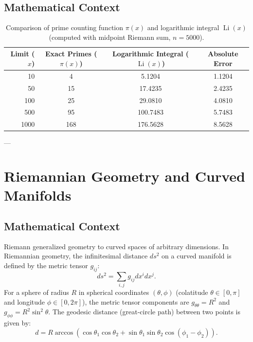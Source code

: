 \documentclass[11pt]{amsart}
\theoremstyle{definition}
\begin{document}
\subsection{Mathematical Context}

\begin{table}[h!]
\centering
\small
\begin{tabular}{rccc}
\toprule
\textbf{Limit ($x$)} & \textbf{Exact Primes ($\pi(x)$)} & \textbf{Logarithmic Integral ($\operatorname{Li}(x)$)} & \textbf{Absolute Error} \\
\midrule
10 & 4 & 5.1204 & 1.1204 \\
50 & 15 & 17.4235 & 2.4235 \\
100 & 25 & 29.0810 & 4.0810 \\
500 & 95 & 100.7483 & 5.7483 \\
1000 & 168 & 176.5628 & 8.5628 \\
\bottomrule
\end{tabular}
\caption{Comparison of prime counting function $\pi(x)$ and logarithmic integral $\operatorname{Li}(x)$ (computed with midpoint Riemann sum, $n=5000$).}
\label{tab:primes}
\end{table}

---

\section{Riemannian Geometry and Curved Manifolds}
\label{sec:geometry}

\subsection{Mathematical Context}
Riemann generalized geometry to curved spaces of arbitrary dimensions. In Riemannian geometry, the infinitesimal distance $ds^2$ on a curved manifold is defined by the metric tensor $g_{ij}$:
\begin{equation}
\label{eq:metric}
ds^2 = \sum_{i,j} g_{ij} dx^i dx^j.
\end{equation}
For a sphere of radius $R$ in spherical coordinates $(\theta, \phi)$ (colatitude $\theta \in [0, \pi]$ and longitude $\phi \in [0, 2\pi]$), the metric tensor components are $g_{\theta\theta} = R^2$ and $g_{\phi\phi} = R^2\sin^2\theta$. The geodesic distance (great-circle path) between two points is given by:
\begin{equation}
\label{eq:geodesic}
d = R \arccos\left(\cos\theta_1\cos\theta_2 + \sin\theta_1\sin\theta_2\cos(\phi_1 - \phi_2)\right).
\end{equation}
\end{document}

